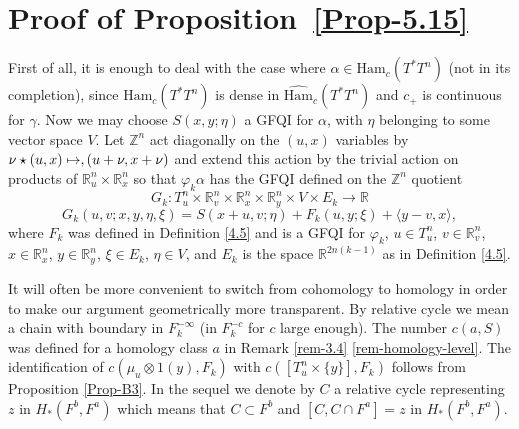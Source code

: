 \documentclass[JEP,XML,SOM,NoFloatCountersInSection,Unicode,published]{cedram}
\newcommand\mto{\mathchoice{\longmapsto}{\mapsto}{\mapsto}{\mapsto}}
\numberwithin{equation}{section}
\newcommand {\DHam}{\mathrm{Ham}}
\newcommand{\gclDHamc}[1]{\widehat{\DHam}_c(#1)}
\newcommand{\GFQI}{\textup{GFQI}\xspace}
\theoremstyle{plain}
\theoremstyle{definition}
\theoremstyle{remark}
\begin{document}
\section{Proof of Proposition~\ref{Prop-5.15}} First of all, it is enough to deal with the case where $\alpha \in {\DHam}_{c}(T^*T^n)$ (\ie not in its completion), since $\DHam_c(T^*T^n)$ is dense in $ \gclDHamc{T^*T^n}$ and $c_+$ is continuous for $\gamma$. Now we may choose
$S(x,y;\eta)$ a \GFQI for $\alpha$, with $\eta$ belonging to some vector space $V$. Let $\mathbb Z^n$ act diagonally on the $(u,x)$ variables by $\nu\star (u,x)\mto, (u+\nu, x+\nu)$ and extend this action by the trivial action on products of $ {\mathbb R}^n_u\times {\mathbb R}^n_x$ so that $\varphi_{k}\alpha$ has the \GFQI defined on the $\mathbb Z^n$ quotient
\[
G_k: T^n_u\times {\mathbb R}^n_v\times {\mathbb R}^n_x\times {\mathbb R} ^n_y\times V\times E_k \to {\mathbb R}
\]
\[
G_{k} (u,v; x,y, \eta, \xi) =
S (x+u,v; \eta) + {F}_{k} (u,y; \xi)+ \langle y-v,x\rangle,
\]
where $F_{k}$ was defined in Definition \ref{4.5} and is a \GFQI for $\varphi_k$, $u \in T^n_u$, $v \in {\mathbb R}^n_v$, $x\in {\mathbb R}^{n}_x$, $y\in {\mathbb R}^{n}_y$, $\xi \in E_{k}$, $\eta \in V$, and $E_{k}$ is the space $ {\mathbb R}^{2n(k-1)}$ as in Definition \ref{4.5}.

It will often be more convenient to switch from cohomology to homology in order to make our argument geometrically more transparent. By relative cycle we mean a chain with boundary in $F_k^{-\infty}$ (\ie in $F_{k}^{-c}$ for $c$ large enough). The number $c(a,S)$ was defined for a homology class $a$ in Remark \ref{rem-3.4} \ref{rem-homology-level}. The identification of \hbox{$c(\mu_{u}\otimes 1(y), F_k)$} with $c([T_u^n \times \{y\}], F_k)$ follows from Proposition \ref{Prop-B3}. In the sequel we denote by $C$ a relative cycle representing $z$ in $H_*(F^b, F^a)$ which means that $C\!\subset\! F^b$ and \hbox{$[C, C\cap F^a]\!=\!z$} in $H_*(F^b, F^a)$.
\end{document}
